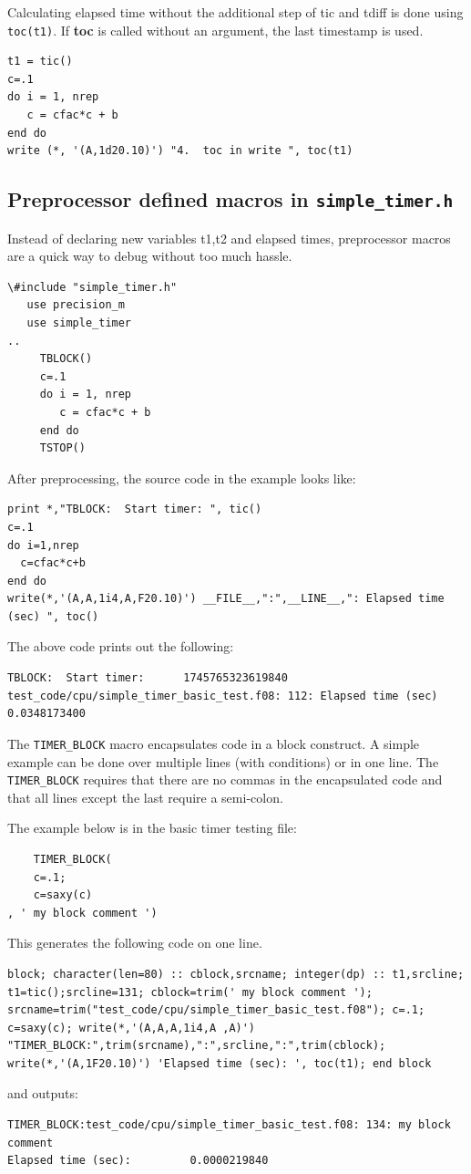 \documentclass[a4paper,11pt]{article}
\begin{document}
Calculating elapsed time without the additional step of tic and tdiff is
   done using \texttt{toc(t1)}. If \textbf{toc} is called without an argument, the last
   timestamp is used.
\begin{lstlisting}
t1 = tic()
c=.1
do i = 1, nrep
   c = cfac*c + b
end do
write (*, '(A,1d20.10)') "4.  toc in write ", toc(t1)
\end{lstlisting}

\subsection{Preprocessor defined macros in \texttt{simple\_timer.h}}
\label{sec:orgf0c7a15}

Instead of declaring new variables t1,t2 and elapsed times, preprocessor
macros are a quick way to debug without too much hassle. 

\begin{lstlisting}
\#include "simple_timer.h"
   use precision_m
   use simple_timer
..
     TBLOCK()
     c=.1
     do i = 1, nrep
        c = cfac*c + b
     end do
     TSTOP()
\end{lstlisting}
After preprocessing, the source code in the example looks like:
\begin{lstlisting}
print *,"TBLOCK:  Start timer: ", tic()
c=.1
do i=1,nrep
  c=cfac*c+b
end do
write(*,'(A,A,1i4,A,F20.10)') __FILE__,":",__LINE__,": Elapsed time (sec) ", toc()
\end{lstlisting}

The above code prints out the following:
\begin{lstlisting}
TBLOCK:  Start timer:      1745765323619840
test_code/cpu/simple_timer_basic_test.f08: 112: Elapsed time (sec)    0.0348173400
\end{lstlisting}


The \texttt{TIMER\_BLOCK} macro encapsulates code in a block construct. A simple
example can be done over multiple lines (with conditions) or in one line.
The \texttt{TIMER\_BLOCK} requires that there are no commas in the encapsulated
code and that all lines except the last require a semi-colon.

The example below is in the basic timer testing file:
\begin{lstlisting}
    TIMER_BLOCK(
    c=.1;
    c=saxy(c)
, ' my block comment ')
\end{lstlisting}
This generates the following code on one line. 
\begin{lstlisting}
block; character(len=80) :: cblock,srcname; integer(dp) :: t1,srcline; t1=tic();srcline=131; cblock=trim(' my block comment '); srcname=trim("test_code/cpu/simple_timer_basic_test.f08"); c=.1; c=saxy(c); write(*,'(A,A,A,1i4,A ,A)') "TIMER_BLOCK:",trim(srcname),":",srcline,":",trim(cblock); write(*,'(A,1F20.10)') 'Elapsed time (sec): ', toc(t1); end block
\end{lstlisting}
and outputs:
\begin{lstlisting}
TIMER_BLOCK:test_code/cpu/simple_timer_basic_test.f08: 134: my block comment
Elapsed time (sec):         0.0000219840
\end{lstlisting}
\end{document}
